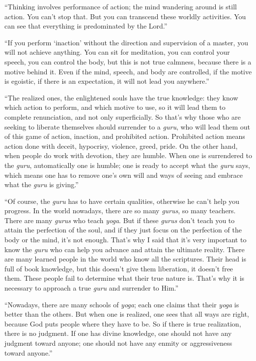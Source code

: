 \documentclass[12pt, twoside, openright]{memoir}
\begin{document}
\enquote{Thinking involves performance of action; the mind wandering around is still action. You can’t stop that. But you can transcend these worldly activities. You can see that everything is predominated by the Lord.}

\enquote{If you perform \enquote{inaction} without the direction and supervision of a master, you will not achieve anything. You can sit for meditation, you can control your speech, you can control the body, but this is not true calmness, because there is a motive behind it. Even if the mind, speech, and body are controlled, if the motive is egoistic, if there is an expectation, it will not lead you anywhere.}

\enquote{The realized ones, the enlightened souls have the true knowledge: they know which action to perform, and which motive to use, so it will lead them to complete renunciation, and not only superficially. So that’s why those who are seeking to liberate themselves should surrender to a \textit{guru}, who will lead them out of this game of action, inaction, and prohibited action. Prohibited action means action done with deceit, hypocrisy, violence, greed, pride. On the other hand, when people do work with devotion, they are humble. When one is surrendered to the \textit{guru}, automatically one is humble; one is ready to accept what the \textit{guru} says, which means one has to remove one’s own will and ways of seeing and embrace what the \textit{guru} is giving.}

\enquote{Of course, the \textit{guru} has to have certain qualities, otherwise he can’t help you progress. In the world nowadays, there are so many \textit{gurus}, so many teachers. There are many \textit{gurus} who teach \textit{yoga}. But if these \textit{gurus} don’t teach you to attain the perfection of the soul, and if they just focus on the perfection of the body or the mind, it’s not enough. That’s why I said that it’s very important to know the \textit{guru} who can help you advance and attain the ultimate reality. There are many learned people in the world who know all the scriptures. Their head is full of book knowledge, but this doesn’t give them liberation, it doesn’t free them. These people fail to determine what their true nature is. That’s why it is necessary to approach a true \textit{guru} and surrender to Him.}

\enquote{Nowadays, there are many schools of \textit{yoga}; each one claims that their \textit{yoga} is better than the others. But when one is realized, one sees that all ways are right, because God puts people where they have to be. So if there is true realization, there is no judgment. If one has divine knowledge, one should not have any judgment toward anyone; one should not have any enmity or aggressiveness toward anyone.}
\end{document}
